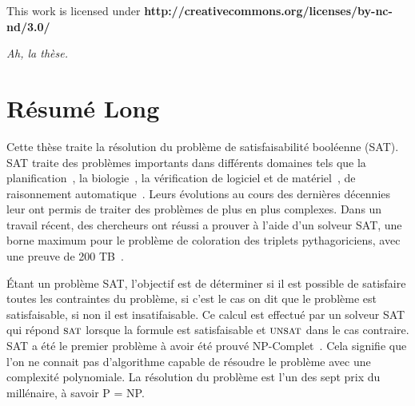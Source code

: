 \clearpage\null\vfill
\thispagestyle{empty}
\begin{minipage}[b]{.9\textwidth}
  \begin{center}
  \setlength{\parskip}{.5\baselineskip}
  {\color{phdcol0}%
   \ccLogo\hspace{.1cm}%
   \ccAttribution\hspace{.1cm}%
   \ccNonCommercial\hspace{.1cm}%
   \ccNoDerivatives}\hspace{.15cm}%
  \footnotesize%
  This work is licensed under {\color{phdcol1}\textbf{http://creativecommons.org/licenses/by-nc-nd/3.0/}}
  \end{center}
\end{minipage}
\vspace*{2\baselineskip}
\clearpage
\thispagestyle{empty}
\begin{flushright}
  \textit{Ah, la thèse.}
\end{flushright}
%
%
%
%

\chapter*{Résumé Long}


Cette thèse traite la résolution du problème de satisfaisabilité booléenne (SAT).
SAT traite des problèmes importants dans différents domaines tels 
que la planification~\cite{planning_92}, la biologie~\cite{biology_06}, la vérification de logiciel et de 
matériel~\cite{biere1999symbolic}, de raisonnement automatique~\cite{heule2016solving}.
Leurs évolutions au cours des dernières décennies leur ont permis de traiter des problèmes de plus en plus complexes.
Dans un travail récent, des chercheurs ont réussi a prouver à l'aide d'un solveur SAT, une borne maximum
pour le problème de coloration des triplets pythagoriciens, avec une preuve de 200 TB~\cite{heule2016solving}.


Étant un problème SAT, l'objectif est de  déterminer si il est possible de satisfaire toutes les contraintes du
problème, si c'est le cas on dit que le problème est satisfaisable, si non il est insatifaisable.
%
Ce calcul est effectué par un solveur SAT qui répond $\textsc{sat}$ lorsque la formule est satisfaisable et $\textsc{unsat}$ dans le cas
contraire. SAT a été le premier problème à avoir été prouvé NP-Complet~\cite{cook1971complexity}. Cela signifie que
l'on ne connait pas d'algorithme capable de résoudre le problème avec une complexité polynomiale.
La résolution du problème est l'un des sept prix du millénaire, à savoir P = NP.


